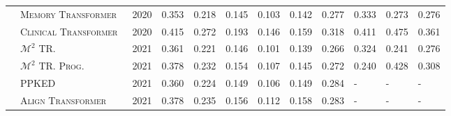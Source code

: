 \documentclass[10pt,journal,compsoc]{IEEEtran}
\begin{document}
\begin{table}
{\begin{tabular}{|c|l|l|llllll|lll|}
                                      & \textsc{Memory Transformer~\cite{chen2020generating}}                                   & 2020                           & 0.353                    & 0.218                    & 0.145                    & 0.103                    & 0.142                   & 0.277                     & 0.333                 & 0.273                 & 0.276                    \\
                                      & \textsc{Clinical Transformer~\cite{lovelace2020learning}}                                 & 2020                           & 0.415                    & 0.272                    & 0.193                    & 0.146                    & 0.159                   & 0.318                     & 0.411                 & 0.475                 & 0.361                    \\
                                      & \textsc{$\mathcal{M}^2$ TR.~\cite{nooralahzadeh2021progressive}}                                                 & 2021                           & 0.361                    & 0.221                    & 0.146                    & 0.101                    & 0.139                   & 0.266                     & 0.324                 & 0.241                 & 0.276                    \\
                                      & \textsc{$\mathcal{M}^2$ TR. Prog.~\cite{nooralahzadeh2021progressive}}                                            & 2021                           & 0.378                    & 0.232                    & 0.154                    & 0.107                    & 0.145                   & 0.272                     & 0.240                 & 0.428                 & 0.308                    \\
                                      & \textsc{PPKED~\cite{liu2021exploring}}                                         & 2021                           & 0.360                    & 0.224                    & 0.149                    & 0.106                    & 0.149                   & 0.284                     & -                     & -                     & -                        \\
                                      & \textsc{Align Transformer~\cite{you2021aligntransformer}}                                    & 2021                           & 0.378                    & 0.235                    & 0.156                    & 0.112                    & 0.158                   & 0.283                     & -                     & -                     & -                        \\

\end{tabular}}
\end{table}
\end{document}
